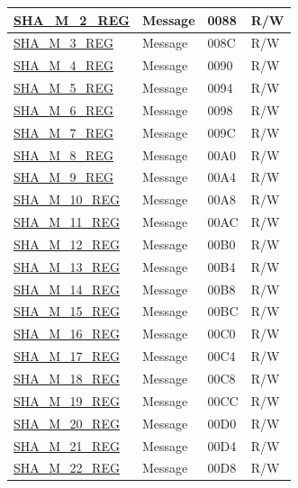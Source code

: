 \begin{longtable}{ | p{6cm} | p{7.2cm} | p{1.3cm} | p{1cm} | }
\hyperref[regdesc:SHAMNREG]{SHA\_M\_2\_REG} & Message & \hexprefix{}0088 & R/W \\ \hline
\hyperref[regdesc:SHAMNREG]{SHA\_M\_3\_REG} & Message & \hexprefix{}008C & R/W \\ \hline
\hyperref[regdesc:SHAMNREG]{SHA\_M\_4\_REG} & Message & \hexprefix{}0090 & R/W \\ \hline
\hyperref[regdesc:SHAMNREG]{SHA\_M\_5\_REG} & Message & \hexprefix{}0094 & R/W \\ \hline
\hyperref[regdesc:SHAMNREG]{SHA\_M\_6\_REG} & Message & \hexprefix{}0098 & R/W \\ \hline
\hyperref[regdesc:SHAMNREG]{SHA\_M\_7\_REG} & Message & \hexprefix{}009C & R/W \\ \hline
\hyperref[regdesc:SHAMNREG]{SHA\_M\_8\_REG} & Message & \hexprefix{}00A0 & R/W \\ \hline
\hyperref[regdesc:SHAMNREG]{SHA\_M\_9\_REG} & Message & \hexprefix{}00A4 & R/W \\ \hline
\hyperref[regdesc:SHAMNREG]{SHA\_M\_10\_REG} & Message & \hexprefix{}00A8 & R/W \\ \hline
\hyperref[regdesc:SHAMNREG]{SHA\_M\_11\_REG} & Message & \hexprefix{}00AC & R/W \\ \hline
\hyperref[regdesc:SHAMNREG]{SHA\_M\_12\_REG} & Message & \hexprefix{}00B0 & R/W \\ \hline
\hyperref[regdesc:SHAMNREG]{SHA\_M\_13\_REG} & Message & \hexprefix{}00B4 & R/W \\ \hline
\hyperref[regdesc:SHAMNREG]{SHA\_M\_14\_REG} & Message & \hexprefix{}00B8 & R/W \\ \hline
\hyperref[regdesc:SHAMNREG]{SHA\_M\_15\_REG} & Message & \hexprefix{}00BC & R/W \\ \hline
\hyperref[regdesc:SHAMNREG]{SHA\_M\_16\_REG} & Message & \hexprefix{}00C0 & R/W \\ \hline
\hyperref[regdesc:SHAMNREG]{SHA\_M\_17\_REG} & Message & \hexprefix{}00C4 & R/W \\ \hline
\hyperref[regdesc:SHAMNREG]{SHA\_M\_18\_REG} & Message & \hexprefix{}00C8 & R/W \\ \hline
\hyperref[regdesc:SHAMNREG]{SHA\_M\_19\_REG} & Message & \hexprefix{}00CC & R/W \\ \hline
\hyperref[regdesc:SHAMNREG]{SHA\_M\_20\_REG} & Message & \hexprefix{}00D0 & R/W \\ \hline
\hyperref[regdesc:SHAMNREG]{SHA\_M\_21\_REG} & Message & \hexprefix{}00D4 & R/W \\ \hline
\hyperref[regdesc:SHAMNREG]{SHA\_M\_22\_REG} & Message & \hexprefix{}00D8 & R/W \\ \hline

\end{longtable}
